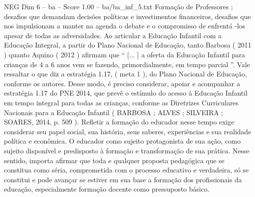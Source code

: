 \begin{textsample}{NEG Dim 6 – ba – Score 1.00 – ba/ba\_inf\_5.txt}
Formação de Professores ; desafios que demandam decisões políticas e investimentos financeiros, desafios que nos impulsionam a manter na agenda o debate e o compromisso de enfrentá -los apesar de todas as adversidades.
Ao articular a Educação Infantil com a Educação Integral, a partir do Plano Nacional de Educação, tanto Barbosa ( 2011 ) quanto Aquino ( 2012 ) afirmam que “ [... ] a oferta da Educação Infantil para crianças de 4 a 6 anos vem se fazendo, primordialmente, em tempo parcial ”.
Vale ressaltar o que diz a estratégia 1.17, ( meta 1 ), do Plano Nacional de Educação, conforme os autores.
Desse modo, é preciso considerar, apoiar e acompanhar a estratégia 1.17 do PNE 2014, que prevê o estímulo do acesso à Educação Infantil em tempo integral para todas as crianças, conforme as Diretrizes Curriculares Nacionais para a Educação Infantil ( BARBOSA ; ALVES ; SILVEIRA ; SOARES, 2014, p. 509 ).
Refletir a formação do educador nesse tempo exige considerar seu papel social, sua história, seus saberes, experiências e sua realidade política e econômica.
O educador como sujeito protagonista de sua ação, como sujeito disponível e predisposto à formação e transformação de sua prática.
Nesse sentido, importa afirmar que toda e qualquer proposta pedagógica que se constitua como séria, comprometida com o processo educativo e verdadeira, só se constitui e pode avançar se estiver em sua base a formação dos profissionais da educação, especialmente formação docente como pressuposto básico.

\end{textsample}
